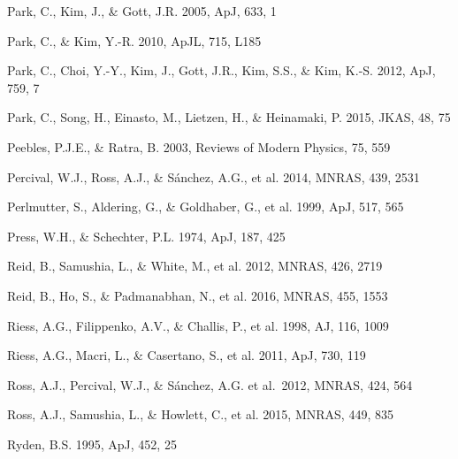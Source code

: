 \documentclass[iop]{emulateapj}
\begin{document}
\begin{thebibliography}{}
Park, C., Kim, J., \& Gott, J.R. 2005, ApJ, 633, 1  

Park, C., \& Kim, Y.-R. 2010, ApJL, 715, L185  

Park, C., Choi, Y.-Y., Kim, J., Gott, J.R., Kim, S.S., \&
Kim, K.-S. 2012, ApJ, 759, 7

Park, C., Song, H., Einasto, M., Lietzen, H., \&
Heinamaki, P. 2015, JKAS, 48, 75

Peebles, P.J.E., \& Ratra, B. 2003, Reviews of Modern Physics, 75, 559

Percival, W.J., Ross, A.J., \& S\'{a}nchez, A.G., et al. 2014, MNRAS, 439, 2531

Perlmutter, S., Aldering, G., \& Goldhaber, G., et al. 1999, ApJ, 517, 565  

Press, W.H., \& Schechter, P.L. 1974, ApJ, 187, 425

Reid, B., Samushia, L., \& White, M., et al. 2012, MNRAS, 426, 2719  

Reid, B., Ho, S., \& Padmanabhan, N., et al.  2016, MNRAS, 455, 1553

Riess, A.G., Filippenko, A.V., \& Challis, P., et al. 1998, AJ, 116, 1009  

Riess, A.G., Macri, L., \& Casertano, S., et al. 2011, ApJ, 730, 119

Ross, A.J., Percival, W.J., \& S{\'a}nchez, A.G. et al.\ 2012, MNRAS, 424, 564 

Ross, A.J., Samushia, L., \& Howlett, C., et al. 2015, MNRAS, 449, 835

Ryden, B.S. 1995, ApJ, 452, 25  




\end{thebibliography}
\end{document}
